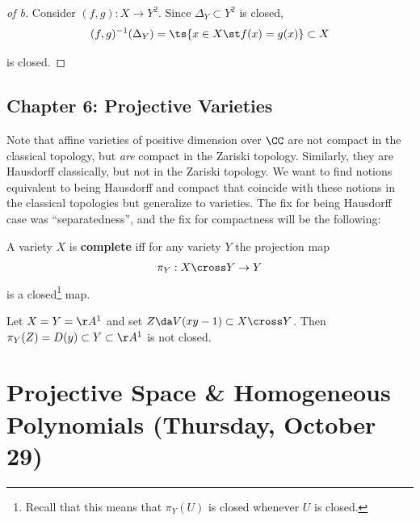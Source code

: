 \begin{proof}[of b]

Consider \((f, g): X\to Y^2\). Since \(\Delta_Y \subset Y^2\) is closed,
\begin{align*}
(f, g)^{-1}(\Delta_Y) = \ts{x\in X \st f(x) = g(x)} \subset X
\end{align*}

is closed.

\end{proof}

\hypertarget{chapter-6-projective-varieties}{%
\subsection{Chapter 6: Projective
Varieties}\label{chapter-6-projective-varieties}}

Note that affine varieties of positive dimension over \(\CC\) are not
compact in the classical topology, but \emph{are} compact in the Zariski
topology. Similarly, they are Hausdorff classically, but not in the
Zariski topology. We want to find notions equivalent to being Hausdorff
and compact that coincide with these notions in the classical topologies
but generalize to varieties. The fix for being Hausdorff case was
``separatedness'', and the fix for compactness will be the following:

\begin{definition}[Complete]

A variety \(X\) is \textbf{complete} iff for any variety \(Y\) the
projection map
\begin{align*}
\pi_Y:X\cross Y\to Y
\end{align*} is a closed\footnote{Recall that this means that
  \(\pi_Y(U)\) is closed whenever \(U\) is closed.} map.

\end{definition}

\begin{example}

Let \(X = Y=\AA^1\) and set \(Z \da V(xy-1)\subset X\cross Y\). Then
\(\pi_Y(Z) = D(y) \subset Y \subset \AA^1\) is not closed.

\end{example}

\hypertarget{projective-space-homogeneous-polynomials-thursday-october-29}{%
\section{Projective Space \& Homogeneous Polynomials (Thursday, October
29)}\label{projective-space-homogeneous-polynomials-thursday-october-29}}

